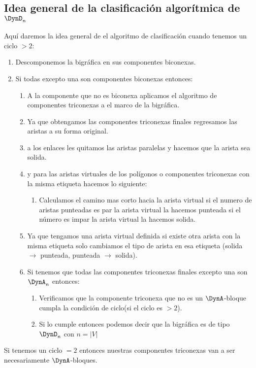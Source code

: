 \subsection{Idea general de la clasificación algorítmica de $\DynD_{n}$}
Aquí daremos la idea general de el algoritmo de clasificación cuando tenemos un ciclo $>2$:
\begin{enumerate}
 \item Descomponemos la bigráfica en sus componentes biconexas.
 \item Si todas excepto una son componentes biconexas entonces:
 \begin{enumerate}
  \item A la componente que no es biconexa aplicamos el algoritmo de componentes triconexas a el marco de la bigráfica.
 \item Ya que obtengamos las componentes triconexas finales regresamos las aristas a su forma original.
 \item a los enlaces les quitamos las aristas paralelas y hacemos que la arista sea solida.
 \item y para las aristas virtuales de los polígonos o componentes triconexas con la misma etiqueta hacemos lo siguiente:
 \begin{enumerate}
  \item Calculamos el camino mas corto hacia la arista virtual si el numero de aristas punteadas es par la arista virtual la hacemos punteada si el número es impar la arista virtual la hacemos solida.
 \end{enumerate}
 \item Ya que tengamos una arista virtual definida si existe otra arista con la misma etiqueta solo cambiamos el tipo de arista en esa etiqueta (solida $\rightarrow $ punteada, punteada $\rightarrow $ solida).
 \item Si tenemos que todas las componentes triconexas finales excepto una son $\DynA_{n}$ entonces:
 \begin{enumerate}
  \item Verificamos que la componente triconexa que no es un $\DynA$-bloque cumpla la condición de ciclo(si el ciclo es $>2$).
  \item Si lo cumple entonces podemos decir que la bigráfica es de tipo $\DynD_{n}$ con $n = \left|V\right|$
 \end{enumerate}
 \end{enumerate}
\end{enumerate}

Si tenemos un ciclo $=2$ entonces nuestras componentes triconexas van a ser necesariamente $\DynA$-bloques.

